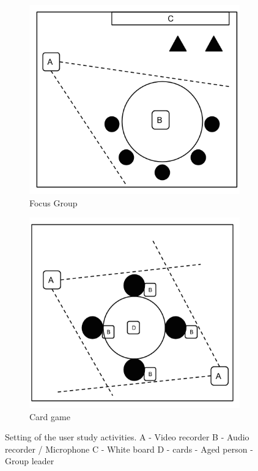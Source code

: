 \begin{figure}
        \centering
        \begin{subfigure}[h]{0.49\textwidth}
                \includegraphics[width=\textwidth]{./img/focusGroup}
                \caption{Focus Group}
                \label{fig:focus-group}
        \end{subfigure}
        \begin{subfigure}[h]{0.49\textwidth}
                \includegraphics[width=\textwidth]{./img/cardGame}
                \caption{Card game}
                \label{fig:card-game}
        \end{subfigure}
        \caption{Setting of the user study activities. A - Video recorder B - Audio recorder / Microphone C - White board D - cards  - Aged person  - Group leader}\label{fig:user-studies}
\end{figure}


